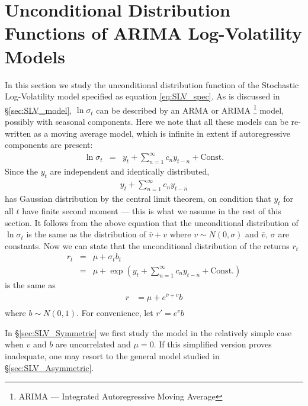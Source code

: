 \section{Unconditional Distribution Functions of ARIMA Log-Volatility
  Models}\label{sec:XieCalc}
In this section we study the unconditional distribution function of
the Stochastic Log-Volatility model specified as equation
\ref{eq:SLV_spec}. As is discussed in \S\ref{sec:SLV_model},
$\ln\sigma_t$ can be described by an ARMA or ARIMA \footnote{ARIMA ---
  Integrated Autoregressive Moving Average} model, possibly with
seasonal components. Here we note that all these models can be
re-written as a moving average model, which is infinite in extent if
autoregressive components are present:
\begin{eqnarray*}
  \ln \sigma_t &=& y_t + \sum_{n=1}^\infty c_n y_{t-n} + \text{Const.}
\end{eqnarray*}
Since the $y_t$ are independent and identically distributed,
\begin{eqnarray*}
  y_t + \sum_{n=1}^\infty c_n y_{t-n}  
\end{eqnarray*}
has Gaussian distribution by the central limit theorem, on condition
that $y_t$ for all $t$ have finite second moment --- this is what we
assume in the rest of this section. It follows from the above equation
that the unconditional distribution of $\ln \sigma_t$ is the same as the
distribution of $\bar{v} + v$ where $v \sim N(0, \sigma)$ and
$\bar{v}$, $\sigma$ are constants. Now we can state that the
unconditional distribution of the returns $r_t$
\begin{eqnarray*}
  r_t &=& \mu + \sigma_t b_t\\
  &=& \mu + \exp\left(
    y_t + \sum_{n=1}^\infty c_n y_{t-n} + \text{Const.}
  \right)
\end{eqnarray*}
 is the same as
\begin{equation}  \label{eq:UnconditionalPdf}
  \begin{aligned}
    r &= \mu + e^{\bar{v} + v} b \\
  \end{aligned}
\end{equation}
where $b \sim N(0, 1)$. For convenience, let $r' = e^v b$

In \S\ref{sec:SLV_Symmetric} we first study the model in the
relatively simple case when $v$ and $b$ are uncorrelated and $\mu
= 0$. If this simplified version proves inadequate, one may resort to
the general model studied in \S\ref{sec:SLV_Asymmetric}.

